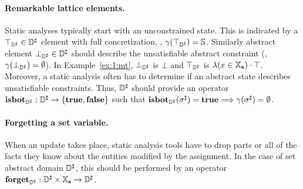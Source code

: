 \paragraph{Remarkable lattice elements.}
Static analyses typically start with an unconstrained state.
This is indicated by a \( \top_{{\mathbb{D}}^{\sharp}} \in {\mathbb{D}}^{\sharp} \) element with full
concretization, \ie, \( \gamma( \top_{{\mathbb{D}}^{\sharp}} ) = \mathbb{S} \).
Similarly abstract element \( \bot_{{\mathbb{D}}^{\sharp}} \in {\mathbb{D}}^{\sharp} \) should describe
the unsatisfiable abstract constraint (\ie, \( \gamma( \bot_{{\mathbb{D}}^{\sharp}} ) =
\emptyset \)).
In Example~\ref{ex:1:mt}, \( \bot_{{\mathbb{D}}^{\sharp}} \) is \( \bot \) and \( \top_{{\mathbb{D}}^{\sharp}} \)
is \( \lambda (x \in \mathbb{X}_{\bf s}) \cdot \top \).
Moreover, a static analysis often has to determine if an abstract state
describes unsatisfiable constraints.
Thus, \( {\mathbb{D}}^{\sharp} \) should provide an operator \( \textbf{isbot}_{{\mathbb{D}}^{\sharp}}: {\mathbb{D}}^{\sharp}
\rightarrow \{ \mathbf{true}, \mathbf{false} \} \) such that \( \textbf{isbot}_{{\mathbb{D}}^{\sharp}}( {\sigma}^{\sharp} )
= \mathbf{true} \Longrightarrow \gamma( {\sigma}^{\sharp} ) = \emptyset \).

\paragraph{Forgetting a set variable.}
When an update takes place, static analysis tools have to drop parts or
all of the facts they know about the entities modified by the assignment.
In the case of set abstract domain \( {\mathbb{D}}^{\sharp} \), this should be performed
by an operator \( \textbf{forget}_{{\mathbb{D}}^{\sharp}}: {\mathbb{D}}^{\sharp} \times \mathbb{X}_{\bf s} \rightarrow {\mathbb{D}}^{\sharp} \).

